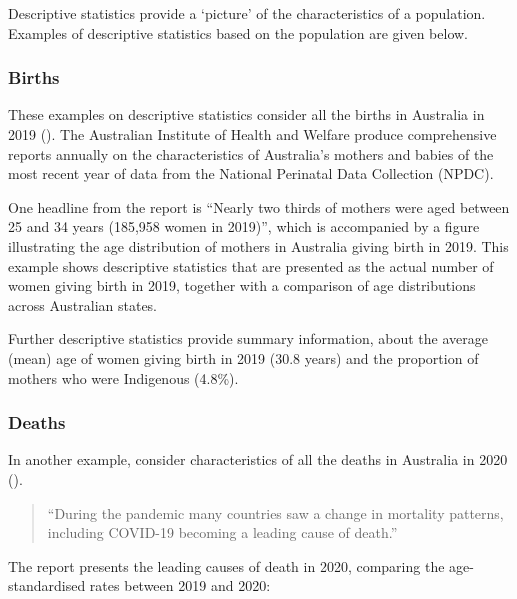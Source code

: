 \documentclass[
]{memoir}
\begin{document}
Descriptive statistics provide a `picture' of the characteristics of a population. Examples of descriptive statistics based on the population are given below.

\hypertarget{births}{%
\subsubsection{Births}\label{births}}

These examples on descriptive statistics consider all the births in Australia in 2019 (\citet{australianinstituteofhealthandwelfare21}). The Australian Institute of Health and Welfare produce comprehensive reports annually on the characteristics of Australia's mothers and babies of the most recent year of data from the National Perinatal Data Collection (NPDC).

One headline from the report is ``Nearly two thirds of mothers were aged between 25 and 34 years (185,958 women in 2019)'', which is accompanied by a figure illustrating the age distribution of mothers in Australia giving birth in 2019. This example shows descriptive statistics that are presented as the actual number of women giving birth in 2019, together with a comparison of age distributions across Australian states.

Further descriptive statistics provide summary information, about the average (mean) age of women giving birth in 2019 (30.8 years) and the proportion of mothers who were Indigenous (4.8\%).

\hypertarget{deaths}{%
\subsubsection{Deaths}\label{deaths}}

In another example, consider characteristics of all the deaths in Australia in 2020 (\citet{australianbureauofstatistics21}).

\begin{quote}
``During the pandemic many countries saw a change in mortality patterns, including COVID-19 becoming a leading cause of death.''
\end{quote}

The report presents the leading causes of death in 2020, comparing the age-standardised rates between 2019 and 2020:
\end{document}
